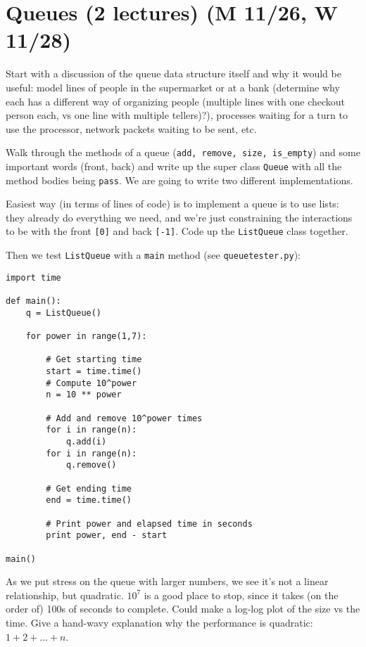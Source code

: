 \documentclass{article}
\begin{document}
\newpage
\section{Queues (2 lectures) (M 11/26, W 11/28)}

Start with a discussion of the queue data structure itself and why it
would be useful: model lines of people in the supermarket or at a bank
(determine why each has a different way of organizing people (multiple
lines with one checkout person each, vs one line with multiple
tellers)?), processes waiting for a turn to use the processor, network
packets waiting to be sent, etc.

Walk through the methods of a queue
(\verb|add, remove, size, is_empty|) and some important words (front,
back) and write up the super class \verb|Queue| with all the method bodies
being \verb|pass|.  We are going to write two different implementations.

Easiest way (in terms of lines of code) is to implement a queue is to
use lists: they already do everything we need, and we're just
constraining the interactions to be with the front \verb|[0]| and back
\verb|[-1]|. Code up the \verb|ListQueue| class together.

Then we test \verb|ListQueue| with a \verb|main| method (see
\verb|queuetester.py|):

\begin{verbatim}
import time

def main():
    q = ListQueue()

    for power in range(1,7):

        # Get starting time
        start = time.time()
        # Compute 10^power
        n = 10 ** power

        # Add and remove 10^power times
        for i in range(n):
            q.add(i)
        for i in range(n):
            q.remove()

        # Get ending time
        end = time.time()

        # Print power and elapsed time in seconds
        print power, end - start

main()
\end{verbatim}

As we put stress on the queue with larger numbers, we see it's not a
linear relationship, but quadratic. $10^7$ is a good place to stop,
since it takes (on the order of) 100s of seconds to complete.  Could
make a log-log plot of the size vs the time.  Give a hand-wavy
explanation why the performance is quadratic: $1 + 2 + \dots + n$.
\end{document}
